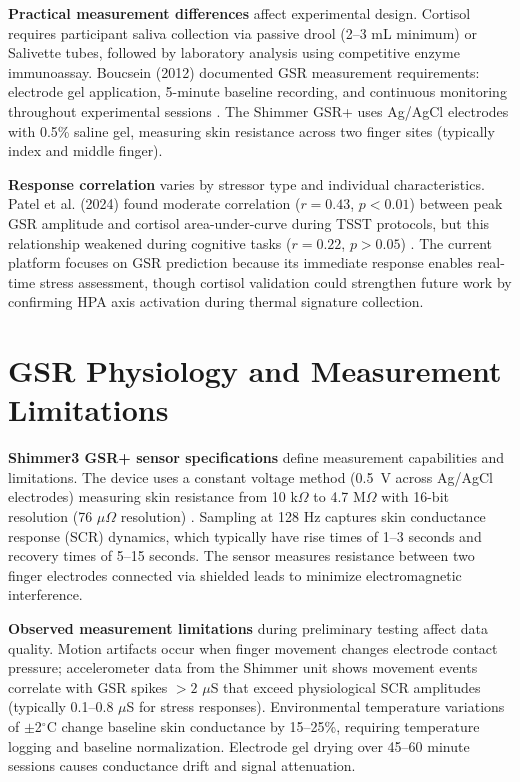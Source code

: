 \textbf{Practical measurement differences} affect experimental design. Cortisol requires participant saliva collection via passive drool (2--3 mL minimum) or Salivette tubes, followed by laboratory analysis using competitive enzyme immunoassay. Boucsein (2012) documented GSR measurement requirements: electrode gel application, 5-minute baseline recording, and continuous monitoring throughout experimental sessions \cite{ref1}. The Shimmer GSR+ uses Ag/AgCl electrodes with 0.5\% saline gel, measuring skin resistance across two finger sites (typically index and middle finger).

\textbf{Response correlation} varies by stressor type and individual characteristics. Patel et al. (2024) found moderate correlation ($r = 0.43$, $p < 0.01$) between peak GSR amplitude and cortisol area-under-curve during TSST protocols, but this relationship weakened during cognitive tasks ($r = 0.22$, $p > 0.05$) \cite{ref7}. The current platform focuses on GSR prediction because its immediate response enables real-time stress assessment, though cortisol validation could strengthen future work by confirming HPA axis activation during thermal signature collection.


\section{GSR Physiology and Measurement Limitations}
\textbf{Shimmer3 GSR+ sensor specifications} define measurement capabilities and limitations. The device uses a constant voltage method (0.5~V across Ag/AgCl electrodes) measuring skin resistance from 10 k$\Omega$ to 4.7 M$\Omega$ with 16-bit resolution (76 $\mu\Omega$ resolution) \cite{ref8}. Sampling at 128 Hz captures skin conductance response (SCR) dynamics, which typically have rise times of 1--3 seconds and recovery times of 5--15 seconds. The sensor measures resistance between two finger electrodes connected via shielded leads to minimize electromagnetic interference.

\textbf{Observed measurement limitations} during preliminary testing affect data quality. Motion artifacts occur when finger movement changes electrode contact pressure; accelerometer data from the Shimmer unit shows movement events correlate with GSR spikes $>2$ $\mu$S that exceed physiological SCR amplitudes (typically 0.1--0.8 $\mu$S for stress responses). Environmental temperature variations of $\pm$2$^\circ$C change baseline skin conductance by 15--25\%, requiring temperature logging and baseline normalization. Electrode gel drying over 45--60 minute sessions causes conductance drift and signal attenuation.

